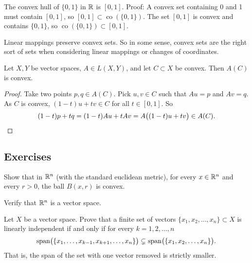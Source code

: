\begin{example}
The convex hull of $\{ 0, 1 \}$ in ${\mathbb{R}}$ is $[0,1]$.  Proof:
A convex set containing 0 and 1 must contain $[0,1]$, so
$[0,1] \subset \operatorname{co}(\{0,1\})$.
The set $[0,1]$ is convex and contains $\{0,1\}$, so
$\operatorname{co}(\{0,1\}) \subset [0,1]$.
\end{example}

Linear mappings preserve convex sets.  So in some sense, convex sets are the
right sort of sets when considering linear mappings or changes of
coordinates.

\begin{prop}
Let $X,Y$ be vector spaces, $A \in L(X,Y)$, and let $C \subset X$ be convex.
Then $A(C)$ is convex.
\end{prop}

\begin{proof}
Take two points $p,q \in A(C)$.  Pick $u,v \in C$ such that
$Au = p$ and $Av=q$.  As $C$ is convex,
$(1-t)u+t v \in C$
for all $t \in [0,1]$.  So
\begin{equation*}
(1-t)p+t q 
=
(1-t)Au+tAv
=
A\bigl((1-t)u+tv\bigr)
\in A(C) .  \qedhere
\end{equation*}
\end{proof}


\subsection{Exercises}

\begin{exercise}
Show that in ${\mathbb{R}}^n$
(with the standard euclidean metric),
for every $x \in {\mathbb{R}}^n$ and every $r > 0$,
the ball $B(x,r)$ is convex.
\end{exercise}


\begin{exercise}
Verify that ${\mathbb{R}}^n$ is a vector space.
\end{exercise}

\begin{exercise}
Let $X$ be a vector space.
Prove that a finite set of vectors $\{ x_1,x_2,\ldots,x_n \} \subset X$ 
is linearly independent if and only if for every $k=1,2,\ldots,n$
\begin{equation*}
\operatorname{span}\bigl( \{ x_1,\ldots,x_{k-1},x_{k+1},\ldots,x_n \}\bigr) \subsetneq
\operatorname{span}\bigl( \{ x_1,x_2,\ldots,x_n \}\bigr) .
\end{equation*}
That is, the span of the set with one vector removed is strictly smaller.
\end{exercise}


